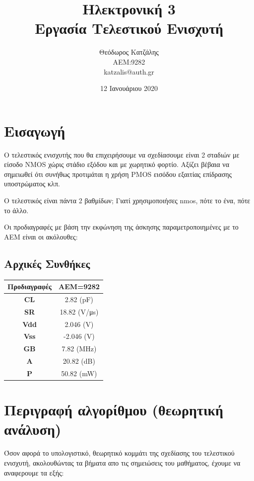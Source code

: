 \documentclass[12pt, a4paper]{article}
\title{\textbf{Ηλεκτρονική 3} \\ \textbf{Εργασία Τελεστικού Ενισχυτή}}
\author{Θεόδωρος Κατζάλης \\ ΑΕΜ:9282 \\ katzalis@auth.gr}
\date{12 Ιανουάριου 2020}
\begin{document}
\maketitle
\sloppy
\tableofcontents
\pagebreak

\section{Εισαγωγή}

Ο τελεστικός ενισχυτής που θα επιχειρήσουμε να σχεδίασουμε είναι 2 σταδιών με είσοδο ΝMOS χώρις στάδιο εξόδου και με χωρητικό φορτίο. Αξίζει βέβαια να σημειωθεί ότι συνήθως προτιμάται η χρήση PMOS εισόδου εξαιτίας επίδρασης υποστρώματος κλπ.

Ο τελεστικός είναι πάντα 2 βαθμίδων; Γιατί χρησιμοποιήσες nmos, πότε το ένα, πότε το άλλο.

Οι προδιαγραφές με βάση την εκφώνηση της άσκησης παραμετροποιημένες με το ΑΕΜ είναι οι ακόλουθες:
\subsection{Αρχικές Συνθήκες}


\begin{table}[h!]
\centering
\begin{tabular}{|c|c|}
	\hline
	Προδιαγραφές & AEM=9282  \\
	\hline
	\textbf{CL} & 2.82 (pF) \\
	\hline
	\textbf{SR} &  18.82 (V/μs)\\
	\hline
	\textbf{Vdd} & 2.046 (V) \\
	\hline
	\textbf{Vss} & -2.046 (V)\\
	\hline
	\textbf{GB} & 7.82 (MHz)\\
    \hline
    \textbf{A} & 20.82 (dB)\\
    \hline
    \textbf{P} & 50.82 (mW)\\
    \hline
\end{tabular}
\end{table}

\section{Περιγραφή αλγορίθμου (θεωρητική ανάλυση)}

Όσον αφορά το υπολογιστικό, θεωρητικό κομμάτι της σχεδίασης του τελεστικού ενισχυτή, ακολουθώντας τα βήματα απο τις σημειώσεις του μαθήματος, έχουμε να αναφερουμε τα εξής:
\end{document}
